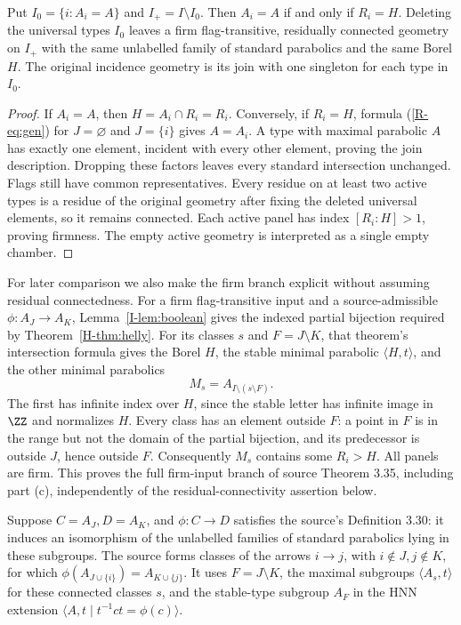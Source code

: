 \begin{lemma}\label{R-lem:active}
Put $I_0=\{i:A_i=A\}$ and $I_+=I\setminus I_0$.
Then $A_i=A$ if and only if $R_i=H$. Deleting the universal types
$I_0$ leaves a firm flag-transitive, residually connected geometry
on $I_+$ with the same unlabelled family of standard parabolics and
the same Borel $H$. The original incidence geometry is its join
with one singleton for each type in $I_0$.
\end{lemma}
\begin{proof}
If $A_i=A$, then $H=A_i\cap R_i=R_i$. Conversely, if $R_i=H$,
formula (\ref{R-eq:gen}) for $J=\varnothing$ and $J=\{i\}$ gives
$A=A_i$. A type with maximal parabolic $A$ has exactly one element,
incident with every other element, proving the join description.
Dropping these factors leaves every standard intersection unchanged.
Flags still have common representatives. Every residue on at least
two active types is a residue of the original geometry after fixing
the deleted universal elements, so it remains connected. Each active
panel has index $[R_i:H]>1$, proving firmness. The empty active
geometry is interpreted as a single empty chamber.
\end{proof}

For later comparison we also make the firm branch explicit without
assuming residual connectedness. For a firm flag-transitive input
and a source-admissible $\phi:A_J\to A_K$,
Lemma~\ref{I-lem:boolean} gives the indexed partial
bijection required by Theorem~\ref{H-thm:helly}. For its classes
$s$ and $F=J\setminus K$, that theorem's intersection formula gives
the Borel $H$, the stable minimal parabolic $\langle H,t\rangle$,
and the other minimal parabolics
\[
 M_s=A_{I\setminus(s\setminus F)}.
\]
The first has infinite index over $H$, since the stable letter has
infinite image in $\ZZ$ and normalizes $H$. Every class has an
element outside $F$: a point in $F$ is in the range but not the
domain of the partial bijection, and its predecessor is outside
$J$, hence outside $F$. Consequently $M_s$ contains some
$R_i>H$. All panels are firm. This proves the full firm-input branch
of source Theorem 3.35, including part (c), independently of the
residual-connectivity assertion below.

Suppose $C=A_J,D=A_K$, and $\phi:C\to D$ satisfies the source's
Definition 3.30: it induces an isomorphism of the unlabelled families
of standard parabolics lying in these subgroups. The source forms
classes of the arrows $i\to j$, with $i\notin J,j\notin K$, for
which $\phi(A_{J\cup\{i\}})=A_{K\cup\{j\}}$. It uses
$F=J\setminus K$, the maximal subgroups $\langle A_s,t\rangle$
for these connected classes $s$, and the stable-type subgroup $A_F$
in the HNN extension $\langle A,t\mid t^{-1}ct=\phi(c)\rangle$.

